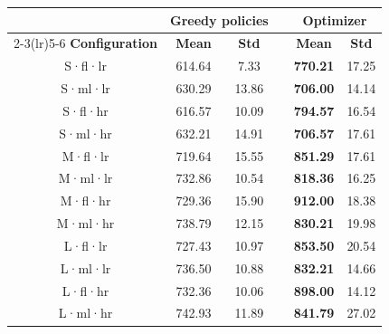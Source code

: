 \begin{tabular}{@{}c cc c cc@{}}
\toprule
& \multicolumn{2}{c}{\textbf{Greedy policies}} & & \multicolumn{2}{c}{\textbf{Optimizer}} \\
\cmidrule(lr){2-3}\cmidrule(lr){5-6}
\textbf{Configuration} & \textbf{Mean} & \textbf{Std} & & \textbf{Mean} & \textbf{Std} \\
\midrule
S·fl·lr & 614.64 & 7.33 & & \textbf{770.21} & 17.25 \\
S·ml·lr & 630.29 & 13.86 & & \textbf{706.00} & 14.14 \\
S·fl·hr & 616.57 & 10.09 & & \textbf{794.57} & 16.54 \\
S·ml·hr & 632.21 & 14.91 & & \textbf{706.57} & 17.61 \\
\addlinespace
M·fl·lr & 719.64 & 15.55 & & \textbf{851.29} & 17.61 \\
M·ml·lr & 732.86 & 10.54 & & \textbf{818.36} & 16.25 \\
M·fl·hr & 729.36 & 15.90 & & \textbf{912.00} & 18.38 \\
M·ml·hr & 738.79 & 12.15 & & \textbf{830.21} & 19.98 \\
\addlinespace
L·fl·lr & 727.43 & 10.97 & & \textbf{853.50} & 20.54 \\
L·ml·lr & 736.50 & 10.88 & & \textbf{832.21} & 14.66 \\
L·fl·hr & 732.36 & 10.06 & & \textbf{898.00} & 14.12 \\
L·ml·hr & 742.93 & 11.89 & & \textbf{841.79} & 27.02 \\
\bottomrule
\end{tabular}